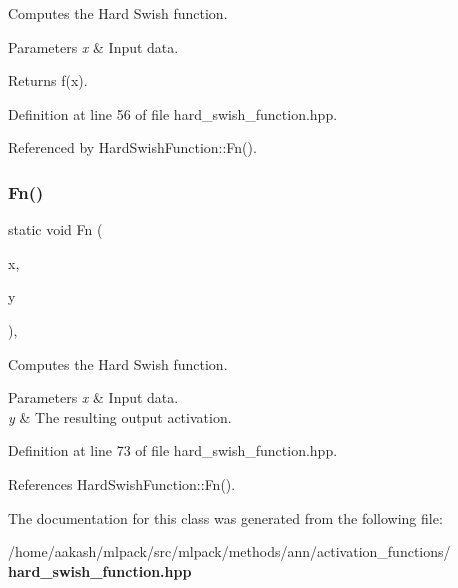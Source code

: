 Computes the Hard Swish function. 


\begin{DoxyParams}{Parameters}
{\em x} & Input data. \\
\hline
\end{DoxyParams}
\begin{DoxyReturn}{Returns}
f(x). 
\end{DoxyReturn}


Definition at line 56 of file hard\+\_\+swish\+\_\+function.\+hpp.



Referenced by Hard\+Swish\+Function\+::\+Fn().

\mbox{\label{classmlpack_1_1ann_1_1HardSwishFunction_af6cf5da90eb6312e3e25c9b8bd9c3527}} 
\subsubsection{Fn()\hspace{0.1cm}{\footnotesize\ttfamily [2/2]}}
{\footnotesize\ttfamily static void Fn (\begin{DoxyParamCaption}\item[{const Input\+Vec\+Type \&}]{x,  }\item[{Output\+Vec\+Type \&}]{y }\end{DoxyParamCaption})\hspace{0.3cm}{\ttfamily [inline]}, {\ttfamily [static]}}



Computes the Hard Swish function. 


\begin{DoxyParams}{Parameters}
{\em x} & Input data. \\
\hline
{\em y} & The resulting output activation. \\
\hline
\end{DoxyParams}


Definition at line 73 of file hard\+\_\+swish\+\_\+function.\+hpp.



References Hard\+Swish\+Function\+::\+Fn().



The documentation for this class was generated from the following file\+:\begin{DoxyCompactItemize}
\item 
/home/aakash/mlpack/src/mlpack/methods/ann/activation\+\_\+functions/\textbf{ hard\+\_\+swish\+\_\+function.\+hpp}\end{DoxyCompactItemize}
